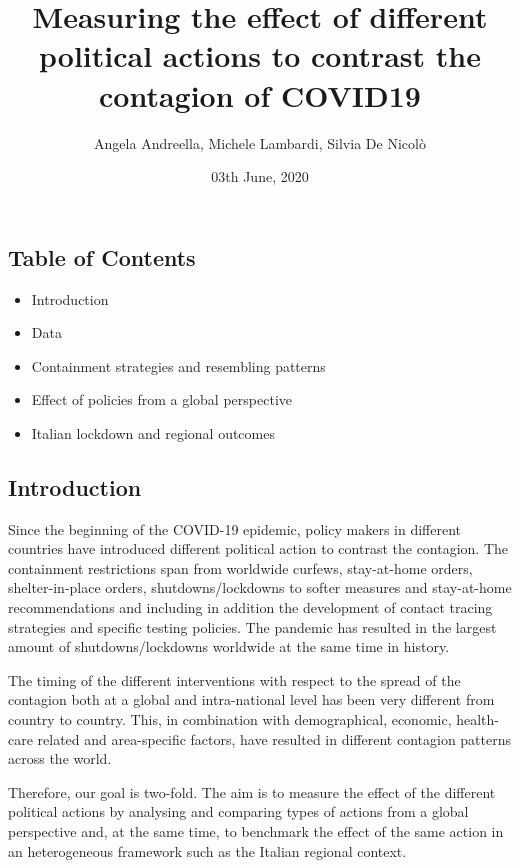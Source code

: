 \documentclass[
  12pt,
]{article}
\title{Measuring the effect of different political actions to contrast the
contagion of COVID19}
\subtitle{Angela Andreella, Michele Lambardi, Silvia De Nicolò}
\author{}
\date{\vspace{-2.5em}03th June, 2020}
\begin{document}
\maketitle

\hypertarget{table-of-contents}{%
\subsection{Table of Contents}\label{table-of-contents}}

\begin{itemize}
\item
  Introduction
\item
  Data
\item
  Containment strategies and resembling patterns
\item
  Effect of policies from a global perspective
\item
  Italian lockdown and regional outcomes
\end{itemize}

\hypertarget{introduction}{%
\subsection{Introduction}\label{introduction}}

Since the beginning of the COVID-19 epidemic, policy makers in different
countries have introduced different political action to contrast the
contagion. The containment restrictions span from worldwide curfews,
stay-at-home orders, shelter-in-place orders, shutdowns/lockdowns to
softer measures and stay-at-home recommendations and including in
addition the development of contact tracing strategies and specific
testing policies. The pandemic has resulted in the largest amount of
shutdowns/lockdowns worldwide at the same time in history.

The timing of the different interventions with respect to the spread of
the contagion both at a global and intra-national level has been very
different from country to country. This, in combination with
demographical, economic, health-care related and area-specific factors,
have resulted in different contagion patterns across the world.

Therefore, our goal is two-fold. The aim is to measure the effect of the
different political actions by analysing and comparing types of actions
from a global perspective and, at the same time, to benchmark the effect
of the same action in an heterogeneous framework such as the Italian
regional context.
\end{document}
